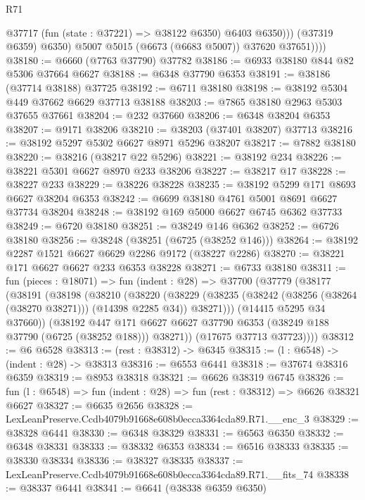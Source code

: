 \begin{lexlean}{R71}
\begin{coremodule}
                  @37717 (fun (state : @37221) => @38122 @6350) @6403 @6350)))
              (@37319 @6359)
              @6350)
            @5007
            @5015
            (@6673 (@6683 @5007))
            @37620
            @37651))))
@38180 := @6660 (@7763 @37790) @37782
@38186 := @6933 @38180 @844 @82 @5306 @37664 @6627
@38188 := @6348 @37790 @6353
@38191 := @38186 (@37714 @38188) @37725
@38192 := @6711 @38180
@38198 := @38192 @5304 @449 @37662 @6629 @37713 @38188
@38203 := @7865 @38180 @2963 @5303 @37655 @37661
@38204 := @232 @37660
@38206 := @6348 @38204 @6353
@38207 := @9171 @38206
@38210 := @38203 (@37401 @38207) @37713
@38216 := @38192 @5297 @5302 @6627 @8971 @5296 @38207
@38217 := @7882 @38180
@38220 := @38216 (@38217 @22 @5296)
@38221 := @38192 @234
@38226 := @38221 @5301 @6627 @8970 @233 @38206
@38227 := @38217 @17
@38228 := @38227 @233
@38229 := @38226 @38228
@38235 := @38192 @5299 @171 @8693 @6627 @38204 @6353
@38242 := @6699 @38180 @4761 @5001 @8691 @6627 @37734 @38204
@38248 := @38192 @169 @5000 @6627 @6745 @6362 @37733
@38249 := @6720 @38180
@38251 := @38249 @146 @6362
@38252 := @6726 @38180
@38256 := @38248 (@38251 (@6725 (@38252 @146)))
@38264 := @38192 @2287 @1521 @6627 @6629 @2286 @9172 (@38227 @2286)
@38270 := @38221 @171 @6627 @6627 @233 @6353 @38228
@38271 := @6733 @38180
@38311 := fun (pieces : @18071) =>
  fun (indent : @28) =>
  @37700
    (@37779
      (@38177
        (@38191
          (@38198
            (@38210
              (@38220
                (@38229
                  (@38235 (@38242 (@38256 (@38264 (@38270 @38271))) (@14398 @2285 @34)) @38271)))
              (@14415 @5295 @34 @37660))
            (@38192
              @447
              @171
              @6627
              @6627
              @37790
              @6353
              (@38249 @188 @37790 (@6725 (@38252 @188)))
              @38271))
          (@17675 @37713 @37723))))
@38312 := @6 @6528
@38313 := (rest : @38312) -> @6345
@38315 := (l : @6548) -> (indent : @28) -> @38313
@38316 := @6553 @6441
@38318 := @37674 @38316 @6359
@38319 := @8953 @38318
@38321 := @6626 @38319 @6745
@38326 := fun (l : @6548) => fun (indent : @28) => fun (rest : @38312) => @6626 @38321 @6627
@38327 := @6635 @2656
@38328 := LexLeanPreserve.Ccdb4079b91668e608b0ecca3364cda89.R71.__enc_3
@38329 := @38328 @6441
@38330 := @6348 @38329
@38331 := @6563 @6350
@38332 := @6348 @38331
@38333 := @38332 @6353
@38334 := @6516 @38333
@38335 := @38330 @38334
@38336 := @38327 @38335
@38337 := LexLeanPreserve.Ccdb4079b91668e608b0ecca3364cda89.R71.__fits_74
@38338 := @38337 @6441
@38341 := @6641 (@38338 @6359 @6350)

\end{coremodule}
\end{lexlean}
